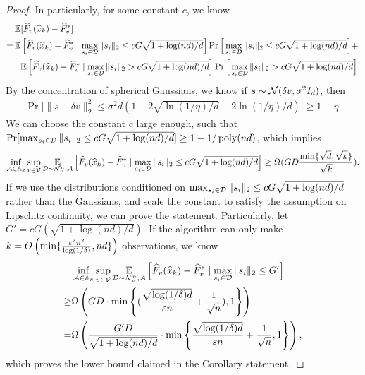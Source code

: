 \begin{proof}
In particularly, for some constant $c$, we know 
\begin{align*}
    &\operatorname*{\mathbb{E}}[\widehat{F}_v(\widehat{x}_k)-\widehat{F}_v^*]\\
    =&\operatorname*{\mathbb{E}}\Big[ \widehat{F}_v(\widehat{x}_k)-\widehat{F}_v^*\mid \max_{s_i\in \mathcal D}\|s_i\|_2\leq cG\sqrt{1+\log(nd)/d}\Big]\Pr\Big[\max_{s_i\in \mathcal D}\|s_i\|_2\leq cG \sqrt{1+\log(nd)/d}\Big]+\\
    &~~\operatorname*{\mathbb{E}}\Big[ \widehat{F}_v(\widehat{x}_k)-\widehat{F}_v^*\mid \max_{s_i\in \mathcal D}\|s_i\|_2> cG\sqrt{1+\log(nd)/d}\Big]\Pr\Big[\max_{s_i\in \mathcal D}\|s_i\|_2> cG\sqrt{1+\log(nd)/d}\Big].
\end{align*}
By the concentration of spherical Gaussians, we know if $s\sim\mathcal N(\delta v,\sigma^2 I_d)$, then 
\begin{align*}
    \Pr\Big[\|s-\delta v\|_2^2\leq \sigma^2 d(1+2\sqrt{\ln(1/\eta)/d}+2\ln(1/\eta)/d)\Big]\geq 1-\eta.
\end{align*}
We can choose the constant $c$ large enough, such that $\Pr[\max_{s_i\in \mathcal D}\|s_i\|_2\leq cG\sqrt{1+\log(nd)/d}]\geq 1-1/\operatorname{poly}(nd)$, which implies
\begin{align*}
    \inf_{\mathcal A\in \mathbb{A}_k}\sup_{v\in \mathcal V}\operatorname*{\mathbb{E}}_{\mathcal D \sim \mathcal N_v^n,\mathcal A}\Big[\widehat{F}_v(\widehat{x}_k)-\widehat{F}_v^*\mid \max_{s_i\in \mathcal D}\|s_i\|_2\leq cG\sqrt{1+\log(nd)/d}\Big]\geq \Omega(GD\frac{\min\{\sqrt{d},\sqrt{k}\}}{\sqrt{k}}).
\end{align*}
If we use the distributions conditioned on $\max_{s_i\in \mathcal D}\|s_i\|_2\leq cG\sqrt{1+\log(nd)/d}$ rather than the Gaussians, and scale the constant to satisfy the assumption on Lipschitz continuity, we can prove the statement.
Particularly, let $G'=cG(\sqrt{1+\log(nd)/d})$. 
If the algorithm can only make $k=O\left(\min\{\frac{\varepsilon^2n^2}{\log(1/\delta)},nd\}\right)$ observations, we know 
\begin{align*}
    &\inf_{\mathcal A\in \mathbb{A}_k}\sup_{v\in \mathcal V}\operatorname*{\mathbb{E}}_{\mathcal D \sim \mathcal N_v^n,\mathcal A}\Big[\widehat{F}_v(\widehat{x}_k)-\widehat{F}_v^*\mid \max_{s_i\in \mathcal D}\|s_i\|_2\leq G'\Big]\\
    \geq&
    \Omega\left( GD\cdot \min\left\{(\frac{\sqrt{\log(1/\delta)d}}{\varepsilon n}+\frac{1}{\sqrt{n}}),1\right\} \right)  \\
    =&\Omega\left( \frac{G' D}{\sqrt{1+\log(nd)/d}}\cdot \min\left\{\frac{\sqrt{\log(1/\delta)d}}{\varepsilon n}+\frac{1}{\sqrt{n}},1\right\}  \right),
\end{align*}
which proves the lower bound claimed in the Corollary statement.
\end{proof}

